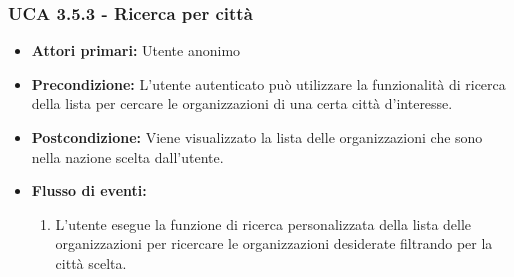 \subsubsection{UCA 3.5.3 - Ricerca per città}%
\begin{itemize}
	\item \textbf{Attori primari:} Utente anonimo
	\item \textbf{Precondizione:} L'utente autenticato può utilizzare la funzionalità di ricerca della lista per cercare le organizzazioni di una certa città d'interesse.
	\item \textbf{Postcondizione:} Viene visualizzato la lista delle organizzazioni che sono nella nazione scelta dall'utente.
	\item \textbf{Flusso di eventi:}
	\begin{enumerate}
		\item L'utente esegue la funzione di ricerca personalizzata della lista delle organizzazioni per ricercare le organizzazioni desiderate filtrando per la città scelta.
	\end{enumerate}
\end{itemize}

